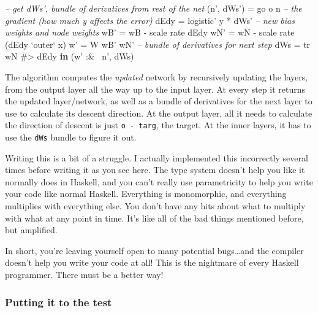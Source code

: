 \documentclass[]{article}
\newenvironment{Shaded}{}{}
\newcommand{\KeywordTok}[1]{\textcolor[rgb]{0.00,0.44,0.13}{\textbf{{#1}}}}
\newcommand{\DataTypeTok}[1]{\textcolor[rgb]{0.56,0.13,0.00}{{#1}}}
\newcommand{\CommentTok}[1]{\textcolor[rgb]{0.38,0.63,0.69}{\textit{{#1}}}}
\newcommand{\OtherTok}[1]{\textcolor[rgb]{0.00,0.44,0.13}{{#1}}}
\newcommand{\FunctionTok}[1]{\textcolor[rgb]{0.02,0.16,0.49}{{#1}}}
\newcommand{\NormalTok}[1]{{#1}}
\begin{document}
\begin{Shaded}
\begin{Highlighting}[]
              \CommentTok{-- get dWs', bundle of derivatives from rest of the net}
              \NormalTok{(n', dWs') }\FunctionTok{=} \NormalTok{go o n}
              \CommentTok{-- the gradient (how much y affects the error)}
              \NormalTok{dEdy       }\FunctionTok{=} \NormalTok{logistic' y }\FunctionTok{*} \NormalTok{dWs'}
              \CommentTok{-- new bias weights and node weights}
              \NormalTok{wB'  }\FunctionTok{=} \NormalTok{wB }\FunctionTok{-} \NormalTok{scale rate dEdy}
              \NormalTok{wN'  }\FunctionTok{=} \NormalTok{wN }\FunctionTok{-} \NormalTok{scale rate (dEdy }\OtherTok{`outer`} \NormalTok{x)}
              \NormalTok{w'   }\FunctionTok{=} \DataTypeTok{W} \NormalTok{wB' wN'}
              \CommentTok{-- bundle of derivatives for next step}
              \NormalTok{dWs  }\FunctionTok{=} \NormalTok{tr wN }\FunctionTok{#>} \NormalTok{dEdy}
          \KeywordTok{in}  \NormalTok{(w' }\FunctionTok{:&~} \NormalTok{n', dWs)}
\end{Highlighting}
\end{Shaded}

The algorithm computes the \emph{updated} network by recursively
updating the layers, from the output layer all the way up to the input
layer. At every step it returns the updated layer/network, as well as a
bundle of derivatives for the next layer to use to calculate its descent
direction. At the output layer, all it needs to calculate the direction
of descent is just \texttt{o\ -\ targ}, the target. At the inner layers,
it has to use the \texttt{dWs} bundle to figure it out.

Writing this is a bit of a struggle. I actually implemented this
incorrectly several times before writing it as you see here. The type
system doesn't help you like it normally does in Haskell, and you can't
really use parametricity to help you write your code like normal
Haskell. Everything is monomorphic, and everything multiplies with
everything else. You don't have any hits about what to multiply with
what at any point in time. It's like all of the bad things mentioned
before, but amplified.

In short, you're leaving yourself open to many potential bugs\ldots{}and
the compiler doesn't help you write your code at all! This is the
nightmare of every Haskell programmer. There must be a better way!

\subsubsection{Putting it to the test}\label{putting-it-to-the-test}
\end{document}
